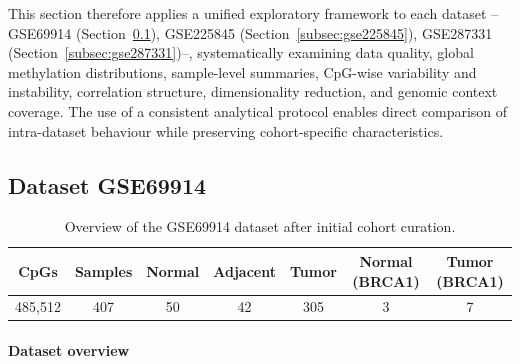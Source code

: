 This section therefore applies a unified exploratory framework to each dataset -- GSE69914 (Section~\ref{subsec:gse69914}), GSE225845 (Section~\ref{subsec:gse225845}), GSE287331 (Section~\ref{subsec:gse287331})--, systematically examining data quality, global methylation distributions, sample-level summaries, CpG-wise variability and instability, correlation structure, dimensionality reduction, and genomic context coverage. The use of a consistent analytical protocol enables direct comparison of intra-dataset behaviour while preserving cohort-specific characteristics.

\subsection{Dataset GSE69914}
\label{subsec:gse69914}

\begin{table}[t]
\centering
\caption{Overview of the GSE69914 dataset after initial cohort curation.}
\label{tab:gse69914_overview}
\scriptsize
\begin{tabular}{c c c c c c c}
\toprule
\textbf{CpGs} &
\textbf{Samples} &
\textbf{Normal} &
\textbf{Adjacent} &
\textbf{Tumor} &
\textbf{Normal (BRCA1)} &
\textbf{Tumor (BRCA1)} \\
\midrule
485{,}512 &
407 &
50 &
42 &
305 &
3 &
7 \\
\bottomrule
\end{tabular}
\end{table}

\paragraph{Dataset overview}
\label{par:gse69914_overview}

